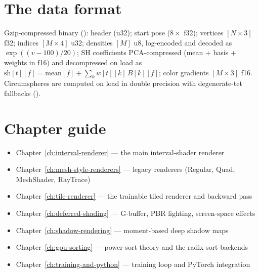 \section{The  data format}

Gzip-compressed binary ():
header  (u32);
start pose ($8\times$ f32); vertices $[N\times3]$ f32; indices $[M\times4]$
u32; densities $[M]$ u8, log-encoded and decoded as
$\exp((v-100)/20)$; SH coefficients PCA-compressed (mean + basis + weights in
f16) and decompressed on load as
$\text{sh}[t][f] = \text{mean}[f] + \sum_k w[t][k]\, B[k][f]$;
color gradients $[M\times3]$ f16. Circumspheres are computed on load in
double precision with degenerate-tet fallbacks
().

\section{Chapter guide}

\begin{itemize}
\item Chapter~\ref{ch:interval-renderer} --- the main interval-shader renderer
\item Chapter~\ref{ch:mesh-style-renderers} --- legacy renderers (Regular, Quad, MeshShader, RayTrace)
\item Chapter~\ref{ch:tile-renderer} --- the trainable tiled renderer and backward pass
\item Chapter~\ref{ch:deferred-shading} --- G-buffer, PBR lighting, screen-space effects
\item Chapter~\ref{ch:shadow-rendering} --- moment-based deep shadow maps
\item Chapter~\ref{ch:gpu-sorting} --- power sort theory and the radix sort backends
\item Chapter~\ref{ch:training-and-python} --- training loop and PyTorch integration
\end{itemize}

